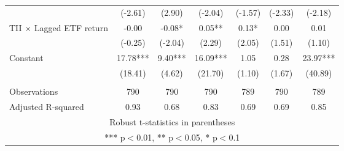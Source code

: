 \documentclass[]{article}
\begin{document}
\begin{tabular}{lcccccc}
 & (-2.61) & (2.90) & (-2.04) & (-1.57) & (-2.33) & (-2.18) \\
TII $\times$ Lagged ETF return & -0.00 & -0.08* & 0.05** & 0.13* & 0.00 & 0.01 \\
 & (-0.25) & (-2.04) & (2.29) & (2.05) & (1.51) & (1.10) \\
Constant & 17.78*** & 9.40*** & 16.09*** & 1.05 & 0.28 & 23.97*** \\
 & (18.41) & (4.62) & (21.70) & (1.10) & (1.67) & (40.89) \\
 &  &  &  &  &  &  \\
Observations & 790 & 790 & 790 & 789 & 790 & 789 \\
 Adjusted R-squared & 0.93 & 0.68 & 0.83 & 0.69 & 0.69 & 0.85 \\ \hline
\multicolumn{7}{c}{ Robust t-statistics in parentheses} \\
\multicolumn{7}{c}{ *** p$<$0.01, ** p$<$0.05, * p$<$0.1} \\
\end{tabular}
\end{document}
